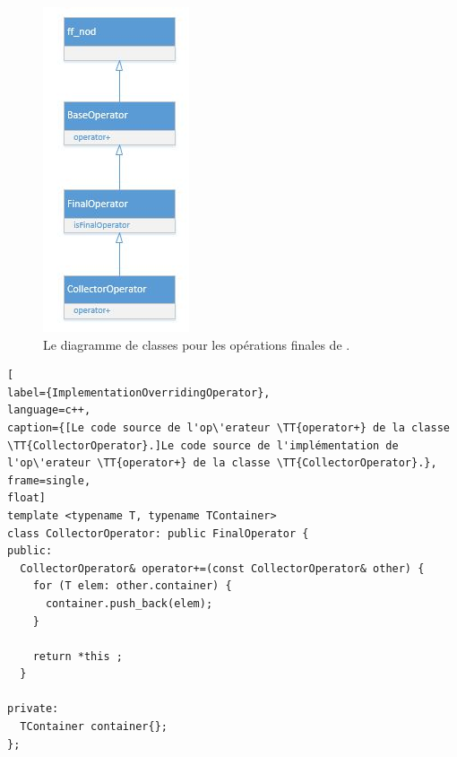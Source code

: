 \begin{figure}
\centering





     \includegraphics[width=.33\linewidth]{Figures/StructureCollectorOperator.jpg}
      \caption{Le diagramme de classes pour les op\'erations finales de .}
       \label{InheritanceCollectorOperator.fig}
\end{figure}


\begin{lstlisting}[
label={ImplementationOverridingOperator},
language=c++,
caption={[Le code source de l'op\'erateur \TT{operator+} de la classe \TT{CollectorOperator}.]Le code source de l'implémentation de l'op\'erateur \TT{operator+} de la classe \TT{CollectorOperator}.},
frame=single,
float]
template <typename T, typename TContainer>
class CollectorOperator: public FinalOperator {
public:
  CollectorOperator& operator+=(const CollectorOperator& other) {
    for (T elem: other.container) {
      container.push_back(elem);
    }

    return *this ;
  }	
  
private:
  TContainer container{};
};
\end{lstlisting}

